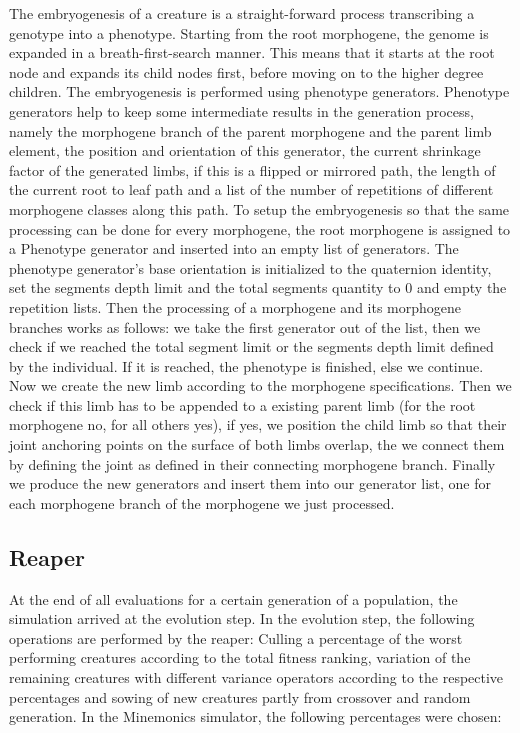 \documentclass[main]{subfiles}
\begin{document}
The embryogenesis of a creature is a straight-forward process transcribing a genotype into a phenotype. Starting from the root morphogene, the genome is expanded in a breath-first-search manner. This means that it starts at the root node and expands its child nodes first, before moving on to the higher degree children. The embryogenesis is performed using phenotype generators. Phenotype generators help to keep some intermediate results in the generation process, namely the morphogene branch of the parent morphogene and the parent limb element, the position and orientation of this generator, the current shrinkage factor of the generated limbs, if this is a flipped or mirrored path, the length of the current root to leaf path and a list of the number of repetitions of different morphogene classes along this path.  To setup the embryogenesis so that the same processing can be done for every morphogene, the root morphogene is assigned to a Phenotype generator and inserted into an empty list of generators. The phenotype generator's base orientation is initialized to the quaternion identity, set the segments depth limit and the total segments quantity to 0 and empty the repetition lists. Then the processing of a morphogene and its morphogene branches works as follows: we take the first generator out of the list, then we check if we reached the total segment limit or the segments depth limit defined by the individual. If it is reached, the phenotype is finished, else we continue. Now we create the new limb according to the morphogene specifications. Then we check if this limb has to be appended to a existing parent limb (for the root morphogene no, for all others yes), if yes, we position the child limb so that their joint anchoring points on the surface of both limbs overlap, the we connect them by defining the joint as defined in their connecting morphogene branch. Finally we produce the new generators and insert them into our generator list, one for each morphogene branch of the morphogene we just processed. 


\subsection{Reaper}
\label{subsection:Reaper}

At the end of all evaluations for a certain generation of a population, the simulation arrived at the evolution step.  In the evolution step, the following operations are performed by the reaper: Culling a percentage of the worst performing creatures according to the total fitness ranking, variation of the remaining creatures with different variance operators according to the respective percentages and sowing of new creatures partly from crossover and random generation. In the Minemonics simulator, the following percentages were chosen:
\end{document}
